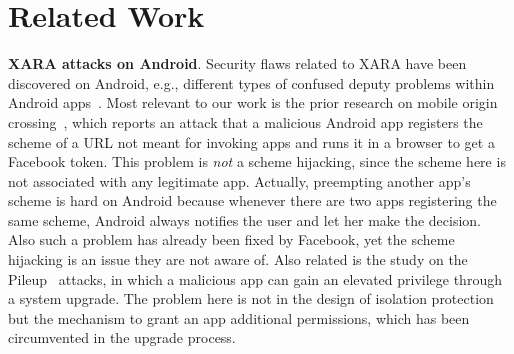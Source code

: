 \documentclass{article}
\begin{document}
\vspace {-5pt}
\section{Related Work}
\label{sec:relatedwork}
\vspace {-2pt}

\vspace {3pt}\noindent\textbf{XARA attacks on Android}. Security flaws related to XARA have been discovered on Android, e.g., different types of confused deputy problems within Android apps~\cite{felt2011permission, Chin:2011:AIC:1999995.2000018, grace2012systematic, Lu_chex:statically}. Most relevant to our work is the prior research on mobile origin crossing~\cite{wang2013unauthorized}, which reports an attack that a malicious Android app registers the scheme of a URL not meant for invoking apps and runs it in a browser to get a Facebook token. This problem is \textit{not} a scheme hijacking, since the scheme here is not associated with any legitimate app. Actually, preempting another app's scheme is hard on Android because whenever there are two apps registering the same scheme, Android always notifies the user and let her make the decision. Also such a problem has already been fixed by Facebook, yet the scheme hijacking is an issue they are not aware of. Also related is the study on the Pileup~\cite{Xing:2014:UYA:2650286.2650760} attacks, in which a malicious app can gain an elevated privilege through a system upgrade. The problem here is not in the design of isolation protection but the mechanism to grant an app additional permissions, which has been circumvented in the upgrade process.
\end{document}
